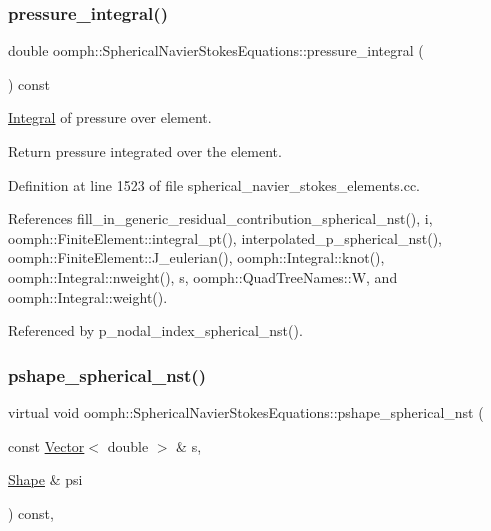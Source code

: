 \subsubsection{\texorpdfstring{pressure\+\_\+integral()}{pressure\_integral()}}
{\footnotesize\ttfamily double oomph\+::\+Spherical\+Navier\+Stokes\+Equations\+::pressure\+\_\+integral (\begin{DoxyParamCaption}{ }\end{DoxyParamCaption}) const}



\hyperlink{classoomph_1_1Integral}{Integral} of pressure over element. 

Return pressure integrated over the element. 

Definition at line 1523 of file spherical\+\_\+navier\+\_\+stokes\+\_\+elements.\+cc.



References fill\+\_\+in\+\_\+generic\+\_\+residual\+\_\+contribution\+\_\+spherical\+\_\+nst(), i, oomph\+::\+Finite\+Element\+::integral\+\_\+pt(), interpolated\+\_\+p\+\_\+spherical\+\_\+nst(), oomph\+::\+Finite\+Element\+::\+J\+\_\+eulerian(), oomph\+::\+Integral\+::knot(), oomph\+::\+Integral\+::nweight(), s, oomph\+::\+Quad\+Tree\+Names\+::W, and oomph\+::\+Integral\+::weight().



Referenced by p\+\_\+nodal\+\_\+index\+\_\+spherical\+\_\+nst().

\mbox{\label{classoomph_1_1SphericalNavierStokesEquations_a17799ec1f3a1d8bbeee1d357bba0a249}} 
\subsubsection{\texorpdfstring{pshape\+\_\+spherical\+\_\+nst()}{pshape\_spherical\_nst()}\hspace{0.1cm}{\footnotesize\ttfamily [1/2]}}
{\footnotesize\ttfamily virtual void oomph\+::\+Spherical\+Navier\+Stokes\+Equations\+::pshape\+\_\+spherical\+\_\+nst (\begin{DoxyParamCaption}\item[{const \hyperlink{classoomph_1_1Vector}{Vector}$<$ double $>$ \&}]{s,  }\item[{\hyperlink{classoomph_1_1Shape}{Shape} \&}]{psi }\end{DoxyParamCaption}) const\hspace{0.3cm}{\ttfamily [protected]}, {}}




